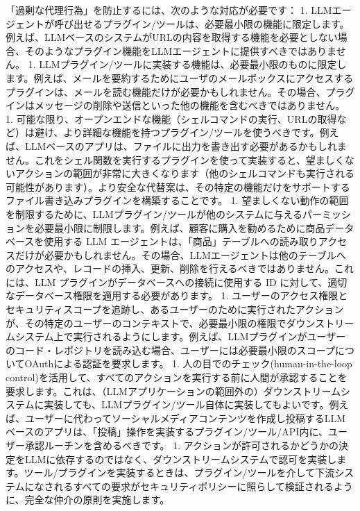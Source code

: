 \documentclass[
]{article}
\begin{document}
「過剰な代理行為」を防止するには、次のような対応が必要です： 1.
LLMエージェントが呼び出せるプラグイン/ツールは、必要最小限の機能に限定します。例えば、LLMベースのシステムがURLの内容を取得する機能を必要としない場合、そのようなプラグイン機能をLLMエージェントに提供すべきではありません。
1.
LLMプラグイン/ツールに実装する機能は、必要最小限のものに限定します。例えば、メールを要約するためにユーザのメールボックスにアクセスするプラグインは、メールを読む機能だけが必要かもしれません。その場合、プラグインはメッセージの削除や送信といった他の機能を含むべきではありません。
1.
可能な限り、オープンエンドな機能（シェルコマンドの実行、URLの取得など）は避け、より詳細な機能を持つプラグイン/ツールを使うべきです。例えば、LLMベースのアプリは、ファイルに出力を書き出す必要があるかもしれません。これをシェル関数を実行するプラグインを使って実装すると、望ましくないアクションの範囲が非常に大きくなります（他のシェルコマンドも実行される可能性があります）。より安全な代替案は、その特定の機能だけをサポートするファイル書き込みプラグインを構築することです。
1.
望ましくない動作の範囲を制限するために、LLMプラグイン/ツールが他のシステムに与えるパーミッションを必要最小限に制限します。例えば、顧客に購入を勧めるために商品データベースを使用する
LLM
エージェントは、「商品」テーブルへの読み取りアクセスだけが必要かもしれません。その場合、LLMエージェントは他のテーブルへのアクセスや、レコードの挿入、更新、削除を行えるべきではありません。これには、LLM
プラグインがデータベースへの接続に使用する ID
に対して、適切なデータベース権限を適用する必要があります。 1.
ユーザーのアクセス権限とセキュリティスコープを追跡し、あるユーザーのために実行されたアクションが、その特定のユーザーのコンテキストで、必要最小限の権限でダウンストリームシステム上で実行されるようにします。例えば、LLMプラグインがユーザーのコード・レポジトリを読み込む場合、ユーザーには必要最小限のスコープについてOAuthによる認証を要求します。
1. 人の目でのチェック(human-in-the-loop
control)を活用して、すべてのアクションを実行する前に人間が承認することを要求します。これは、（LLMアプリケーションの範囲外の）ダウンストリームシステムに実装しても、LLMプラグイン/ツール自体に実装してもよいです。例えば、ユーザーに代わってソーシャルメディアコンテンツを作成し投稿するLLMベースのアプリは、「投稿」操作を実装するプラグイン/ツール/API内に、ユーザー承認ルーチンを含めるべきです。
1.
アクションが許可されるかどうかの決定をLLMに依存するのではなく、ダウンストリームシステムで認可を実装します。ツール/プラグインを実装するときは、プラグイン/ツールを介して下流システムになされるすべての要求がセキュリティポリシーに照らして検証されるように、完全な仲介の原則を実施します。
\end{document}
